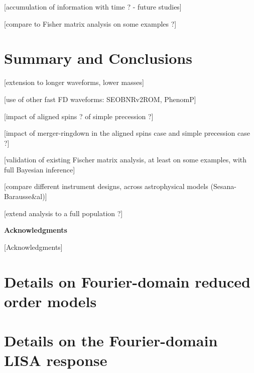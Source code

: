 \documentclass[aps,showpacs,twocolumn,prd,superscriptaddress,nofootinbib]{revtex4}
\begin{document}
[accumulation of information with time ? - future studies]

[compare to Fisher matrix analysis on some examples ?]


\section{Summary and Conclusions}
\label{sec:conc}

[extension to longer waveforms, lower masses]

[use of other fast FD waveforms: SEOBNRv2ROM, PhenomP]

[impact of aligned spins ? of simple precession ?]

[impact of merger-ringdown in the aligned spins case and simple precession case ?]

[validation of existing Fischer matrix analysis, at least on some examples, with full Bayesian inference]

[compare different instrument designs, across astrophysical models (Sesana-Barausse\&al)]

[extend analysis to a full population ?]


\vspace{4.5mm}

\hspace{0.85in}
{\bf Acknowledgments}

\vspace{3.5mm}

[Acknowledgments]


\appendix

\section{Details on Fourier-domain reduced order models}
\label{app:rom}


\section{Details on the Fourier-domain LISA response}
\label{app:fdresponse}
\end{document}

